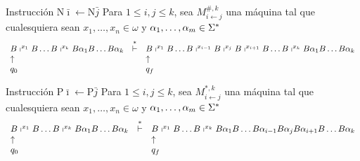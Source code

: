 \begin{frame}
  \begin{block}{Instrucción $\mathrm{N}\bar{\imath} \leftarrow \mathrm{N}\bar{j}$}
    \PN Para $1 \leq i,j \leq k$, sea $M_{i\leftarrow j}^{\#,k}$ una máquina tal que cualesquiera sean $x_{1}, \dotsc,
    x_{n} \in \omega$ y $\alpha_{1}, \dotsc,\alpha_{m} \in \Sigma^{\ast}$
    \minLetter
    \[
      \begin{array}{lcl}
        B \shortmid^{x_{1}} B \dotsc B \shortmid^{x_{k}} B \alpha_{1} B \dotsc B \alpha_{k} &\overset{\ast}{\vdash}& B
          \shortmid^{x_{1}} B \dotsc B \shortmid^{x_{i-1}} B \shortmid^{x_{j}} B \shortmid^{x_{i+1}} B \dotsc B
          \shortmid^{x_{k}} B \alpha_{1} B \dotsc B \alpha_{k} \\
        \uparrow && \uparrow \\
        q_{0} & & q_{f}
      \end{array}
    \]
  \end{block}

  \begin{block}{Instrucción $\mathrm{P}\bar{\imath} \leftarrow \mathrm{P}\bar{j}$}
    \PN Para $1 \leq i,j \leq k$, sea $M_{i\leftarrow j}^{\ast,k}$ una máquina tal que cualesquiera sean $x_{1}, \dotsc,
    x_{n} \in \omega$ y $\alpha_{1}, \dotsc,\alpha_{m} \in \Sigma^{\ast}$
    \minLetter
    \[
      \begin{array}{lcl}
        B \shortmid^{x_{1}} B \dotsc B \shortmid^{x_{k}} B \alpha_{1} B \dotsc B \alpha_{k} &\overset{\ast}{\vdash}& B
          \shortmid^{x_{1}} B \dotsc B \shortmid^{x_{k}} B \alpha_{1} B \dotsc B \alpha_{i-1} B \alpha_{j} B
          \alpha_{i+1} B \dotsc B \alpha_{k} \\
        \uparrow && \uparrow \\
        q_{0} & & q_{f}
      \end{array}
    \]
  \end{block}
\end{frame}
